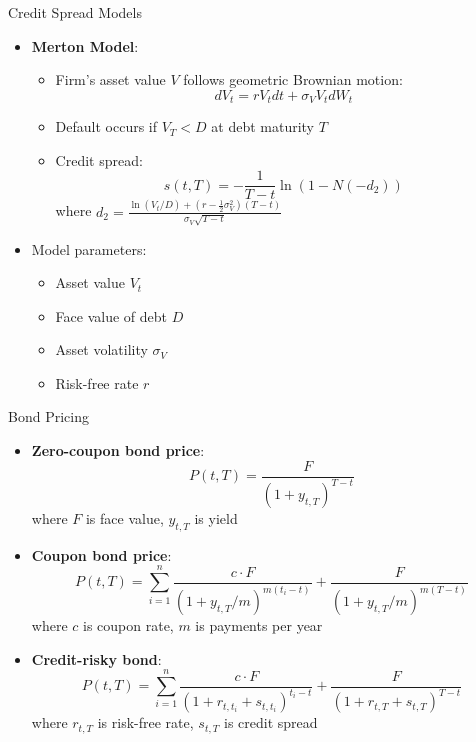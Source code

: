 \documentclass{beamer}
\begin{document}
\begin{frame}{Credit Spread Models}
\begin{itemize}
    \item \textbf{Merton Model}:
    \begin{itemize}
        \item Firm's asset value $V$ follows geometric Brownian motion:
        \begin{equation}
        dV_t = rV_tdt + \sigma_V V_t dW_t
        \end{equation}
        \item Default occurs if $V_T < D$ at debt maturity $T$
        \item Credit spread:
        \begin{equation}
        s(t,T) = -\frac{1}{T-t}\ln(1 - N(-d_2))
        \end{equation}
        where $d_2 = \frac{\ln(V_t/D) + (r-\frac{1}{2}\sigma_V^2)(T-t)}{\sigma_V\sqrt{T-t}}$
    \end{itemize}
    
    \item Model parameters:
    \begin{itemize}
        \item Asset value $V_t$
        \item Face value of debt $D$
        \item Asset volatility $\sigma_V$
        \item Risk-free rate $r$
    \end{itemize}
\end{itemize}
\end{frame}

\begin{frame}{Bond Pricing}
\begin{itemize}
    \item \textbf{Zero-coupon bond price}:
    \begin{equation}
    P(t,T) = \frac{F}{(1+y_{t,T})^{T-t}}
    \end{equation}
    where $F$ is face value, $y_{t,T}$ is yield
    
    \item \textbf{Coupon bond price}:
    \begin{equation}
    P(t,T) = \sum_{i=1}^n \frac{c \cdot F}{(1+y_{t,T}/m)^{m(t_i-t)}} + \frac{F}{(1+y_{t,T}/m)^{m(T-t)}}
    \end{equation}
    where $c$ is coupon rate, $m$ is payments per year
    
    \item \textbf{Credit-risky bond}:
    \begin{equation}
    P(t,T) = \sum_{i=1}^n \frac{c \cdot F}{(1+r_{t,t_i}+s_{t,t_i})^{t_i-t}} + \frac{F}{(1+r_{t,T}+s_{t,T})^{T-t}}
    \end{equation}
    where $r_{t,T}$ is risk-free rate, $s_{t,T}$ is credit spread
\end{itemize}
\end{frame}
\end{document}
